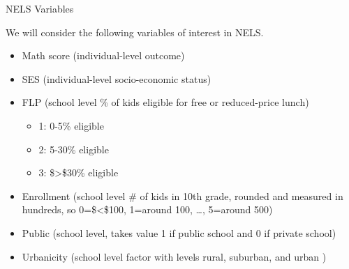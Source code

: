 \documentclass[ignorenonframetext,]{beamer}
\providecommand{\tightlist}{%
  \setlength{\itemsep}{0pt}\setlength{\parskip}{0pt}}
\begin{document}
\begin{frame}{NELS Variables}

We will consider the following variables of interest in NELS.

\begin{itemize}
\tightlist
\item
  Math score (individual-level outcome)
\item
  SES (individual-level socio-economic status)
\item
  FLP (school level \% of kids eligible for free or reduced-price lunch)

  \begin{itemize}
  \tightlist
  \item
    1: 0-5\% eligible
  \item
    2: 5-30\% eligible
  \item
    3: \$\textgreater{}\$30\% eligible
  \end{itemize}
\item
  Enrollment (school level \# of kids in 10th grade, rounded and
  measured in hundreds, so 0=\$\textless{}\$100, 1=around 100, \ldots{},
  5=around 500)
\item
  Public (school level, takes value 1 if public school and 0 if private
  school)
\item
  Urbanicity (school level factor with levels rural, suburban, and urban
  )
\end{itemize}

\end{frame}
\end{document}
